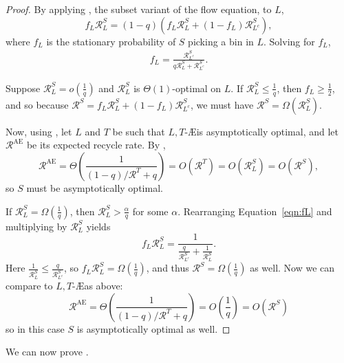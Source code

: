 \begin{proof}
	By applying , the subset variant of the
	flow equation, to $L$, 
	\[ f_L \mathcal{R}_L^S = (1-q)(f_L \mathcal{R}_L^S + (1-f_L) \mathcal{R}_{L^c}^S), \]
	where $f_L$ is the stationary probability of $S$ picking a bin in $L$.
	Solving for $f_L$,
	\begin{align} 
		f_L = \frac{\mathcal{R}_{L^c}^S}{q\mathcal{R}_L^S +
          \mathcal{R}_{L^c}^S}. \label{eqn:fL}
	\end{align}

	Suppose $\mathcal{R}_L^S = o\left(\frac{1}{q}\right)$ and $\mathcal{R}_L^S$
	is $\Theta(1)$-optimal on $L$. If $\mathcal{R}_L^S\leq \frac{1}{q}$, then
	$f_L \geq \frac{1}{2}$, and so because $\mathcal{R}^S = f_L\mathcal{R}_L^S
	+ (1-f_L)\mathcal{R}_{L^c}^S$, we must have $\mathcal{R}^S =
	\Omega(\mathcal{R}_L^S)$.

	Now, using , let $L$ and $T$ be such that $L,T$-\AE is
	asymptotically optimal, and let $\mathcal{R}^\textrm{AE}$ be its expected
	recycle rate. By ,
        \[ \mathcal{R}^\mathrm{AE} = \Theta\left( \frac{1}{(1-q)/\mathcal{R}^T + q}\right) = O\left(\mathcal{R}^T\right) = O\left(\mathcal{R}_L^S\right) = O\left(\mathcal{R}^S\right),\label{eqn:RAE}
        \]
	so $S$ must be asymptotically optimal.

	If $\mathcal{R}_L^S = \Omega\left(\frac{1}{q}\right)$, then
	$\mathcal{R}_L^S > \frac{\alpha}{q}$ for some $\alpha$. Rearranging
	Equation~\eqref{eqn:fL} and multiplying by
	$\mathcal{R}_L^S$ yields
	\[ f_L \mathcal{R}_L^S = \frac{1}{\frac{q}{\mathcal{R}_{L^c}^S} + \frac{1}{\mathcal{R}_L^S}}. \]
	Here $\frac{1}{\mathcal{R}_L^S} \leq \frac{q}{\mathcal{R}_{L^c}^S}$, so
	$f_L\mathcal{R}_L^S = \Omega\left(\frac{1}{q}\right)$, and thus
	$\mathcal{R}^S = \Omega\left(\frac{1}{q}\right)$ as well. Now we can
	compare to $L,T$-\AE as above:
	\[ 	\mathcal{R}^\mathrm{AE}
		= \Theta\left( \frac{1}{(1-q)/\mathcal{R}^T + q}\right)
		= O\left(\frac{1}{q}\right)
		= O\left(\mathcal{R}^S\right)
		\]
	so in this case $S$ is asymptotically optimal as well.
\end{proof}	

We can now prove .

